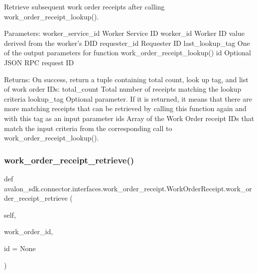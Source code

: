 \begin{DoxyVerb}Retrieve subsequent work order receipts after calling
work_order_receipt_lookup().

Parameters:
worker_service_id Worker Service ID
worker_id         Worker ID value derived from the worker's DID
requester_id      Requester ID
last_lookup_tag   One of the output parameters for function
          work_order_receipt_lookup()
id                Optional JSON RPC request ID

Returns:
On success, return a tuple containing total count, look up tag, and
list of work order IDs:
total_count       Total number of receipts matching the lookup
          criteria
lookup_tag        Optional parameter. If it is returned, it means
          that there are more matching receipts that can be
          retrieved by calling this function again and with
          this tag as an input parameter
ids               Array of the Work Order receipt IDs that match the
          input criteria from the corresponding call to
          work_order_receipt_lookup().
\end{DoxyVerb}
 \mbox{\label{classavalon__sdk_1_1connector_1_1interfaces_1_1work__order__receipt_1_1WorkOrderReceipt_ab9d041cca5f340a855d5b66a92ba4e77}} 
\subsubsection{\texorpdfstring{work\+\_\+order\+\_\+receipt\+\_\+retrieve()}{work\_order\_receipt\_retrieve()}}
{\footnotesize\ttfamily def avalon\+\_\+sdk.\+connector.\+interfaces.\+work\+\_\+order\+\_\+receipt.\+Work\+Order\+Receipt.\+work\+\_\+order\+\_\+receipt\+\_\+retrieve (\begin{DoxyParamCaption}\item[{}]{self,  }\item[{}]{work\+\_\+order\+\_\+id,  }\item[{}]{id = {\ttfamily None} }\end{DoxyParamCaption})}

